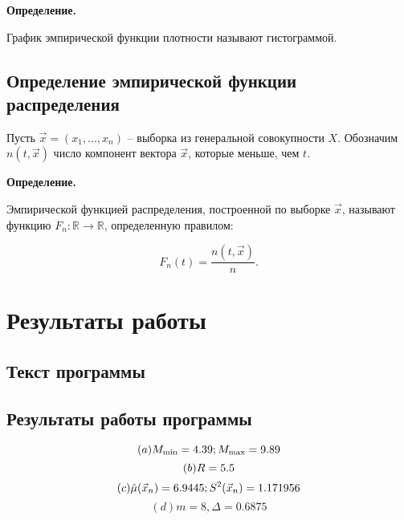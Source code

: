 \textbf{Определение.}

График эмпирической функции плотности называют гистограммой.


\section{Определение эмпирической функции распределения}

Пусть $\vec x = (x_1, ..., x_n)$ -- выборка из генеральной совокупности $X$. Обозначим $n(t, \vec x)$ число компонент вектора $\vec x$, которые меньше, чем $t$.

\textbf{Определение.}

Эмпирической функцией распределения, построенной по выборке $\vec x$, называют функцию $F_n: \mathbb{R} \to \mathbb{R}$, определенную правилом: 

\begin{equation*}
    F_n(t) = \frac{n(t, \vec x)}{n}.
\end{equation*}



\chapter{Результаты работы}

\section{Текст программы}




\section{Результаты работы программы}
\begin{equation*}
    (a) M_{\min} = 4.39;  M_{\max} = 9.89 \\
\end{equation*}
\begin{equation*}
    (b) R = 5.5 \\
\end{equation*}
\begin{equation*}
    (c) \hat\mu(\vec x_n) = 6.9445; S^2(\vec x_n) = 1.171956 \\
\end{equation*}
\begin{equation*}
    (d) m = 8, \Delta = 0.6875
\end{equation*}





